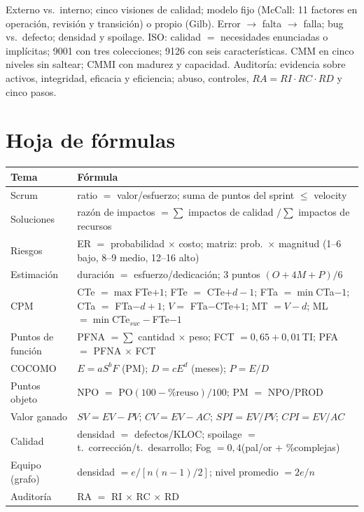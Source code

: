 \documentclass[11pt,a4paper]{article}
\begin{document}
\begin{enresumen}
Externo vs.\ interno; cinco visiones de calidad; modelo fijo (McCall: 11 factores en operación, revisión y
transición) o propio (Gilb). Error $\to$ falta $\to$ falla; bug vs.\ defecto; densidad y spoilage. ISO: calidad
$=$ necesidades enunciadas o implícitas; 9001 con tres colecciones; 9126 con seis características. CMM en cinco
niveles sin saltear; CMMI con madurez y capacidad. Auditoría: evidencia sobre activos, integridad, eficacia y
eficiencia; abuso, controles, $RA = RI \cdot RC \cdot RD$ y cinco pasos.
\end{enresumen}

\section{Hoja de fórmulas}
\label{sec:formulas}
\begin{center}\small
\renewcommand{\arraystretch}{1.3}
\begin{tabularx}{\textwidth}{@{}l X@{}}
\toprule
\textbf{Tema} & \textbf{Fórmula}\\
\midrule
Scrum & ratio $=$ valor/esfuerzo; suma de puntos del sprint $\le$ velocity\\
Soluciones & razón de impactos $= \sum$ impactos de calidad $/ \sum$ impactos de recursos\\
Riesgos & ER $=$ probabilidad $\times$ costo; matriz: prob.\ $\times$ magnitud (1--6 bajo, 8--9 medio, 12--16 alto)\\
Estimación & duración $=$ esfuerzo/dedicación; 3 puntos $(O+4M+P)/6$\\
CPM & CTe $=\max$FTe$+1$; FTe $=$ CTe$+d-1$; FTa $=\min$CTa$-1$; CTa $=$ FTa$-d+1$; $V=$ FTa$-$CTe$+1$; MT $=V-d$; ML $=\min$CTe$_{suc}-$FTe$-1$\\
Puntos de función & PFNA $=\sum$ cantidad $\times$ peso; FCT $=0{,}65+0{,}01\,$TI; PFA $=$ PFNA $\times$ FCT\\
COCOMO & $E=aS^bF$ (PM); $D=cE^d$ (meses); $P=E/D$\\
Puntos objeto & NPO $=$ PO$(100-\%\text{reuso})/100$; PM $=$ NPO/PROD\\
Valor ganado & $SV=EV-PV$; $CV=EV-AC$; $SPI=EV/PV$; $CPI=EV/AC$\\
Calidad & densidad $=$ defectos/KLOC; spoilage $=$ t.\ corrección/t.\ desarrollo; Fog $=0{,}4$(pal/or $+$ \%complejas)\\
Equipo (grafo) & densidad $=e/[n(n-1)/2]$; nivel promedio $=2e/n$\\
Auditoría & RA $=$ RI $\times$ RC $\times$ RD\\
\bottomrule
\end{tabularx}
\end{center}
\end{document}

